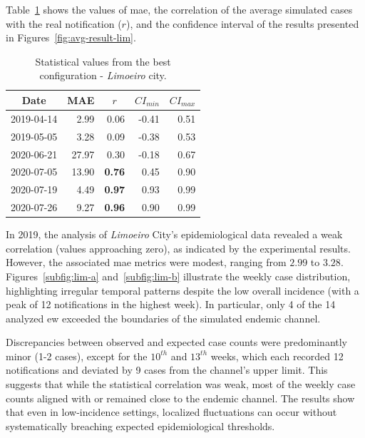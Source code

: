 Table~\ref{tab:statistical-data-lim} shows the values of \gls{mae}, the correlation of the average simulated cases with the real notification ($r$), and the confidence interval of the results presented in Figures~\ref{fig:avg-result-lim}.

\begin{table}[!ht]
\centering
\caption{Statistical values from the best configuration - \textit{Limoeiro} city.}
\label{tab:statistical-data-lim}
\small{%
\begin{tabular}{lrrrr}
\toprule
  \multicolumn{1}{c}{\textbf{Date}} &
  \multicolumn{1}{c}{\textbf{MAE}} &
  \multicolumn{1}{c}{\textbf{$r$}} &
  \multicolumn{1}{c}{\textbf{$CI_{min}$}} &
  \multicolumn{1}{c}{\textbf{$CI_{max}$}} \\ \midrule
2019-04-14 & 2.99  & 0.06          & -0.41 & 0.51 \\
2019-05-05 & 3.28  & 0.09          & -0.38 & 0.53 \\
2020-06-21 & 27.97 & 0.30          & -0.18 & 0.67 \\
2020-07-05 & 13.90 & \textbf{0.76} & 0.45  & 0.90 \\
2020-07-19 & 4.49  & \textbf{0.97} & 0.93  & 0.99 \\
2020-07-26 & 9.27  & \textbf{0.96} & 0.90  & 0.99 \\ \bottomrule
\end{tabular}%
}
\end{table}

In 2019, the analysis of \textit{Limoeiro} City’s epidemiological data revealed a weak correlation (values approaching zero), as indicated by the experimental results. However, the associated \gls{mae} metrics were modest, ranging from $2.99$ to $3.28$. Figures~\ref{subfig:lim-a} and~\ref{subfig:lim-b} illustrate the weekly case distribution, highlighting irregular temporal patterns despite the low overall incidence (with a peak of 12 notifications in the highest week). In particular, only 4 of the 14 analyzed \gls{ew} exceeded the boundaries of the simulated endemic channel.

Discrepancies between observed and expected case counts were predominantly minor (1-2 cases), except for the $10^{th}$ and $13^{th}$ weeks, which each recorded 12 notifications and deviated by 9 cases from the channel’s upper limit. This suggests that while the statistical correlation was weak, most of the weekly case counts aligned with or remained close to the endemic channel. The results show that even in low-incidence settings, localized fluctuations can occur without systematically breaching expected epidemiological thresholds.

